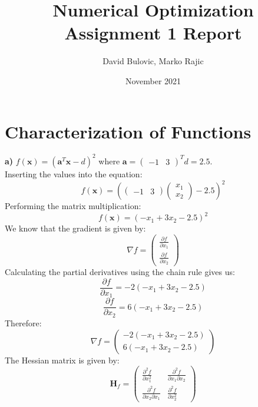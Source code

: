 \documentclass{article}
\title{Numerical Optimization Assignment 1 Report}
\author{David Bulovic, Marko Rajic}
\date{November 2021}
\begin{document}
\maketitle

\section{Characterization of Functions}
\textbf{a)} $f(\boldsymbol{x}) = (\boldsymbol{a}^T \boldsymbol{x} - d)^2$ where $\boldsymbol{a} = \begin{pmatrix}-1 & 3\end{pmatrix}^T d = 2.5$.\\
Inserting the values into the equation:
\begin{equation*}
    f(\boldsymbol{x}) = (\begin{pmatrix}-1 & 3\end{pmatrix} \begin{pmatrix} x_1 \\ x_2 \end{pmatrix} - 2.5)^2
\end{equation*}
Performing the matrix multiplication:
\begin{equation*}
    f(\boldsymbol{x}) = (-x_1 + 3x_2 - 2.5)^2
\end{equation*}
We know that the gradient is given by:
\begin{equation*}
    \nabla f = \begin{pmatrix} \frac{\partial f}{\partial x_1}\\ \frac{\partial f}{\partial x_2}\end{pmatrix}
\end{equation*}
Calculating the partial derivatives using the chain rule gives us:
\begin{equation*}
    \frac{\partial f}{\partial x_1} = -2(-x_1 + 3x_2 -2.5)
\end{equation*}
\begin{equation*}
    \frac{\partial f}{\partial x_2} = 6(-x_1 + 3x_2 -2.5)
\end{equation*}
Therefore:
\begin{equation*}
    \nabla f = \begin{pmatrix} -2(-x_1 + 3x_2 -2.5)\\ 6(-x_1 + 3x_2 -2.5)\end{pmatrix}
\end{equation*}
The Hessian matrix is given by:
\begin{equation*}
    \textbf{H}_f = \begin{pmatrix} \frac{\partial ^2 f}{\partial x_1^2} & \frac{\partial ^2 f}{\partial x_1 \partial x_2}\\ \frac{\partial ^2 f}{\partial x_2 \partial x_1} & \frac{\partial ^2 f}{\partial x_2^2}\end{pmatrix}
\end{equation*}
\end{document}
